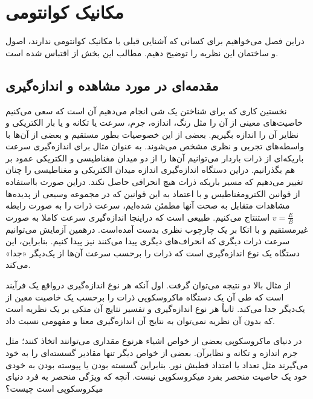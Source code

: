 \chapter{مکانیک کوانتومی}
دراین فصل می‌خواهیم برای کسانی که آشنایی قبلی با مکانیک کوانتومی ندارند، اصول و ساختمان این نظریه را توضیح دهیم. مطالب این بخش از  \cite{ 
 		nielsen10,
 		wolf19,
 		qis
 		}
اقتباس شده است. 


\section{مقدمه‌ای در مورد مشاهده و اندازه‌گیری}

نخستین کاری که برای شناختن یک شی انجام می‌دهیم آن است که سعی می‌کنیم خاصیت‌های معینی از آن را مثل رنگ، اندازه، جرم، سرعت یا تکانه و یا بار الکتریکی و نظایر آن را اندازه بگیریم. 
بعضی از این خصوصیات بطور مستقیم و بعضی از آن‌ها
با واسطه‌های تجربی و نظری مشخص می‌شوند. به عنوان مثال برای اندازه‌گیری سرعت باریکه‌ای از
ذرات باردار می‌توانیم آن‌ها را  از دو میدان مغناطیسی و الکتریکی عمود بر هم بگذرانیم. 
دراین دستگاه اندازه‌گیری اندازه میدان
الکتریکی و مغناطیسی را چنان تغییر می‌دهیم که مسیر باریکه ذرات هیچ انحرافی حاصل نکند. 
دراین صورت بااستفاده از
قوانین الکترومغناطیس و با اعتماد به این قوانین که در مجموعه وسیعی از پدیده‌ها مشاهدات متقابل به صحت آنها مطمئن
شده‌ایم، سرعت ذرات را به صورت رابطه $v = \frac{E}{B}$ استنتاج می‌کنیم. 
طبیعی است که دراینجا اندازه‌گیری سرعت کاملا به
صورت غیرمستقیم و با اتکا بر یک چارچوب نظری بدست آمده‌است.
 درهمین آزمایش می‌توانیم سرعت ذرات دیگری که
انحراف‌های دیگری پیدا می‌کنند نیز پیدا کنیم.
 بنابراین، این دستگاه یک نوع اندازه‌گیری است که ذرات را برحسب سرعت
آن‌ها از یک‌دیگر «جدا» می‌کند.

از  مثال بالا دو نتیجه می‌توان گرفت.
 اول آنکه هر نوع اندازه‌گیری درواقع یک فرآیند است که طی آن یک
دستگاه ماکروسکوپی ذرات را برحسب یک خاصیت معین از یک‌دیگر جدا می‌کند.
 ثانیاً هر نوع اندازه‌گیری و تفسیر نتایج آن
متکی بر یک نظریه است که بدون آن نظریه نمی‌توان به نتایج آن اندازه‌گیری معنا و مفهومی نسبت داد.

در دنیای ماکروسکوپی بعضی از خواص اشیاء هرنوع مقداری می‌توانند اتخاذ کنند؛ مثل جرم اندازه و تکانه و نظایرآن. بعضی
از خواص دیگر تنها مقادیر گسسته‌ای را به خود می‌گیرند مثل تعداد یا امتداد قطبش نور. بنابراین گسسته بودن یا پیوسته بودن
به خودی خود یک خاصیت منحصر بفرد میکروسکوپی نیست. آنچه که ویژگی منحصر به فرد دنیای میکروسکوپی است چیست؟


